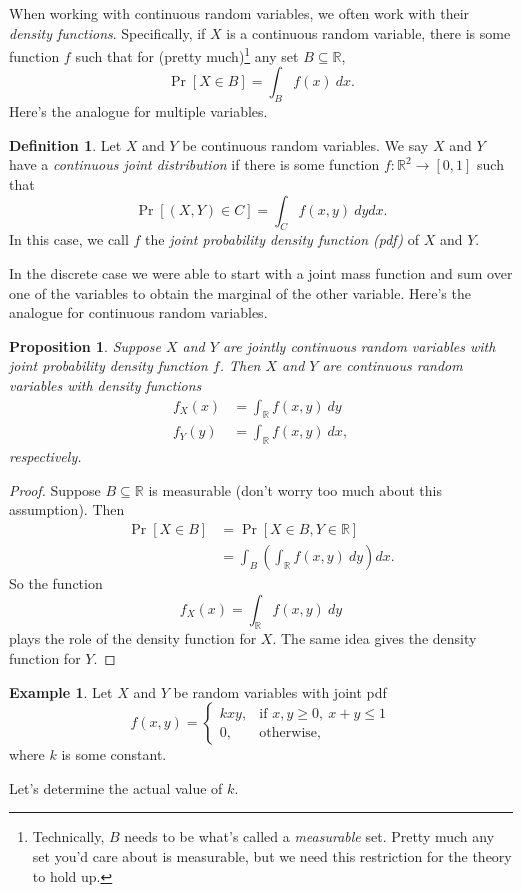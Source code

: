 \documentclass[12pt]{article}
\theoremstyle{plain}
\newtheorem{proposition}[theorem]{Proposition}
\theoremstyle{definition}
\newtheorem{definition}[theorem]{Definition}
\newtheorem{example}[theorem]{Example}
\theoremstyle{remark}
\newcommand{\R}{\mathbb{R}}
\begin{document}
When working with continuous random variables, we often work with their \emph{density functions}.
Specifically, if $X$ is a continuous random variable, there is some function $f$ such that for (pretty much)\footnote{Technically, $B$ needs to be what's called a \emph{measurable} set. Pretty much any set you'd care about is measurable, but we need this restriction for the theory to hold up.} any set $B\subseteq \R$,
\[
    \Pr[X\in B] = \int_Bf(x)\ dx.
\]
Here's the analogue for multiple variables.

\begin{definition}
    Let $X$ and $Y$ be continuous random variables.
    We say $X$ and $Y$ have a \emph{continuous joint distribution} if there is some function $f: \R^2\to [0,1]$ such that
    \[
        \Pr[(X,Y)\in C] = \int_Cf(x,y)\ dydx.
    \]
    In this case, we call $f$ the \emph{joint probability density function (pdf)} of $X$ and $Y$.
\end{definition}

In the discrete case we were able to start with a joint mass function and sum over one of the variables to obtain the marginal of the other variable.
Here's the analogue for continuous random variables.

\begin{proposition}
    Suppose $X$ and $Y$ are jointly continuous random variables with joint probability density function $f$.
    Then $X$ and $Y$ are continuous random variables with density functions
    \begin{align*}
        f_X(x) &= \int_\R f(x,y)\ dy\\
        f_Y(y) &= \int_\R f(x,y)\ dx,
    \end{align*}
    respectively.
\end{proposition}
\begin{proof}
    Suppose $B\subseteq \R$ is measurable (don't worry too much about this assumption).
    Then
    \begin{align*}
        \Pr[X\in B] &= \Pr[X\in B, Y\in \R]\\
        &= \int_B\left(\int_\R f(x,y)\ dy\right)dx.
    \end{align*}
    So the function
    \[
        f_X(x) = \int_\R f(x,y)\ dy
    \]
    plays the role of the density function for $X$.
    The same idea gives the density function for $Y$.
\end{proof}

\begin{example}
    Let $X$ and $Y$ be random variables with joint pdf
    \[
        f(x,y) = \begin{cases}
            kxy,&\text{if }x,y\geq 0,\ x+y \leq 1\\
            0,&\text{otherwise,}
        \end{cases}
    \]
    where $k$ is some constant.

    Let's determine the actual value of $k$.

\end{example}
\end{document}
